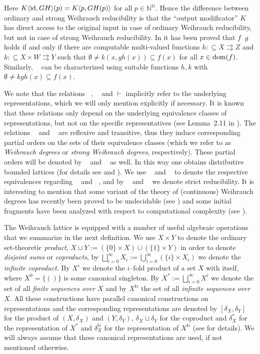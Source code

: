 \documentclass[a4paper]{amsart}
\def\IN{{\mathbb{N}}}
\def\In{\subseteq}
\def\mto{\rightrightarrows}
\def\id{{\rm id}}
\def\dom{{\rm dom}}
\def\Baire{{\IN^\IN}}
\def\leqW{\mathop{\leq_{\mathrm{W}}}}
\def\equivW{\mathop{\equiv_{\mathrm{W}}}}
\def\leqSW{\mathop{\leq_{\mathrm{sW}}}}
\def\equivSW{\mathop{\equiv_{\mathrm{sW}}}}
\def\lW{\mathop{<_{\mathrm{W}}}}
\def\lSW{\mathop{<_{\mathrm{sW}}}}
\theoremstyle{definition}
\begin{document}
Here $K\langle\id,GH\rangle(p)=K\langle p,GH(p)\rangle$ for all $p\in\Baire$.
Hence the difference between ordinary and strong Weihrauch reducibility is that the ``output modificator'' $K$ has
direct access to the original input in case of ordinary Weihrauch reducibility, but not in case of strong Weihrauch reducibility. 
In \cite{GM09} it has been proved that $f\leqW g$ holds if and only if there are computable multi-valued functions
$h:\In X\mto Z$ and $k:\In X\times W\mto Y$ such that
$\emptyset\not=k(x,gh(x))\In f(x)$ for all $x\in\dom(f)$. Similarly, $\leqSW$ can be characterized using suitable functions $h,k$ with
$\emptyset\not=kgh(x)\In f(x)$.

We note that the relations $\leqW$, $\leqSW$ and $\vdash$ implicitly refer to the underlying representations, which
we will only mention explicitly if necessary. It is known that these relations only depend on the underlying equivalence
classes of representations, but not on the specific representatives (see Lemma~2.11 in \cite{BG11}).
The relations $\leqW$ and $\leqSW$ are reflexive and transitive, thus they induce corresponding partial orders on the sets of 
their equivalence classes (which we refer to as {\em Weihrauch degrees} or {\em strong Weihrauch degrees}, respectively).
These partial orders will be denoted by $\leqW$ and $\leqSW$ as well. In this way one obtains distributive bounded lattices
(for details see \cite{Pau09} and \cite{BG11}).
We use $\equivW$ and $\equivSW$ to denote the respective equivalences regarding $\leqW$ and $\leqSW$, 
and by $\lW$ and $\lSW$ we denote strict reducibility.
It is interesting to mention that some variant of the theory of (continuous) Weihrauch degrees has recently
been proved to be undecidable (see \cite{KSZ10}) and some initial fragments have been analyzed with
respect to computational complexity (see \cite{HS11}).

The Weihrauch lattice is equipped with a number of useful algebraic operations that we summarize in the next definition.
We use $X\times Y$ to denote the ordinary set-theoretic {\em product}, $X\sqcup Y:=(\{0\}\times X)\cup(\{1\}\times Y)$ in order
to denote {\em disjoint sums} or {\em coproducts}, by $\bigsqcup_{i=0}^\infty X_i:=\bigcup_{i=0}^\infty(\{i\}\times X_i)$ we denote the 
{\em infinite coproduct}. By $X^i$ we denote the $i$--fold product of a set $X$ with itself, where $X^0=\{()\}$ is some canonical singleton.
By $X^*:=\bigsqcup_{i=0}^\infty X^i$ we denote the set of all {\em finite sequences over $X$}
and by $X^\IN$ the set of all {\em infinite sequences over $X$}. 
All these constructions have parallel canonical constructions on representations and the corresponding representations
are denoted by $[\delta_X,\delta_Y]$ for the product of $(X,\delta_X)$ and $(Y,\delta_Y)$, $\delta_X\sqcup\delta_Y$
for the coproduct and $\delta^*_X$ for the representation of $X^*$ and $\delta_X^\IN$ for the representation
of $X^\IN$ (see \cite{BG11,Pau09,BBP} for details). We will always assume that these canonical representations
are used, if not mentioned otherwise. 
\end{document}
